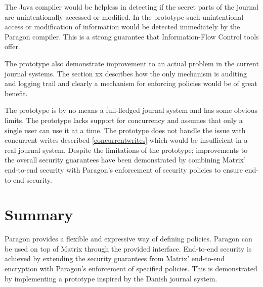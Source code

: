The Java compiler would be helpless in detecting if the secret parts of the journal are unintentionally accessed or modified. In the prototype such unintentional access or modification of information would be detected immediately by the Paragon compiler. This is a strong guarantee that Information-Flow Control tools offer.

The prototype also demonstrate improvement to an actual problem in the current journal systems. The section xx describes how the only mechanism is auditing and logging trail and clearly a mechanism for enforcing policies would be of great benefit. 

The prototype is by no means a full-fledged journal system and has some obvious limits. The prototype lacks support for concurrency and assumes that only a single user can use it at a time. The prototype does not handle the issue with concurrent writes described \ref{concurrentwrites} which would be insufficient in a real journal system. Despite the limitations of the prototype; improvements to the overall security guarantees have been demonstrated by combining Matrix' end-to-end security with Paragon's enforcement of security policies to ensure end-to-end security.



\section{Summary}

Paragon provides a flexible and expressive way of defining policies. Paragon can be used on top of Matrix through the provided interface. End-to-end security is achieved by extending the security guarantees from Matrix' end-to-end encryption with Paragon's enforcement of specified policies. This is demonstrated by implementing a prototype inspired by the Danish journal system.



